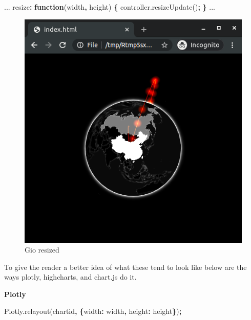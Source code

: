\documentclass[
]{krantz}
\makeatletter
\newenvironment{Shaded}{\begin{snugshade}}{\end{snugshade}}
\newcommand{\AttributeTok}[1]{\textcolor[rgb]{0.61,0.61,0.61}{#1}}
\newcommand{\DataTypeTok}[1]{\textcolor[rgb]{0.27,0.27,0.27}{#1}}
\newcommand{\KeywordTok}[1]{\textcolor[rgb]{0.27,0.27,0.27}{\textbf{#1}}}
\newcommand{\NormalTok}[1]{#1}
\newcommand{\OperatorTok}[1]{\textcolor[rgb]{0.43,0.43,0.43}{\textbf{#1}}}
\newcommand{\StringTok}[1]{\textcolor[rgb]{0.5,0.5,0.5}{#1}}
\newcommand{\VariableTok}[1]{\textcolor[rgb]{0,0,0}{#1}}
\newenvironment{kframe}{%
\medskip{}
\setlength{\fboxsep}{.8em}
 \def\at@end@of@kframe{}%
 \ifinner\ifhmode%
  \def\at@end@of@kframe{\end{minipage}}%
  \begin{minipage}{\columnwidth}%
 \fi\fi%
 \def\FrameCommand##1{\hskip\@totalleftmargin \hskip-\fboxsep
 \colorbox{shadecolor}{##1}\hskip-\fboxsep
     \hskip-\linewidth \hskip-\@totalleftmargin \hskip\columnwidth}%
 \MakeFramed {\advance\hsize-\width
   \@totalleftmargin\z@ \linewidth\hsize
   \@setminipage}}%
 {\par\unskip\endMakeFramed%
 \at@end@of@kframe}
\renewenvironment{Shaded}{\begin{kframe}}{\end{kframe}}
\makeatother
\begin{document}
\begin{Shaded}
\begin{Highlighting}[]
\NormalTok{...}
\NormalTok{resize}\OperatorTok{:} \KeywordTok{function}\NormalTok{(width}\OperatorTok{,}\NormalTok{ height) }\OperatorTok{\{}
  \VariableTok{controller}\NormalTok{.}\AttributeTok{resizeUpdate}\NormalTok{()}\OperatorTok{;}
\OperatorTok{\}}
\NormalTok{...}
\end{Highlighting}
\end{Shaded}

\begin{figure}
\centering
\includegraphics{images/gio-small.png}
\caption{Gio resized}
\end{figure}

To give the reader a better idea of what these tend to look like below are the ways plotly, highcharts, and chart.js do it.

\textbf{Plotly}

\begin{Shaded}
\begin{Highlighting}[]
\VariableTok{Plotly}\NormalTok{.}\AttributeTok{relayout}\NormalTok{(}\StringTok{\textquotesingle{}chartid\textquotesingle{}}\OperatorTok{,} \OperatorTok{\{}\DataTypeTok{width}\OperatorTok{:}\NormalTok{ width}\OperatorTok{,} \DataTypeTok{height}\OperatorTok{:}\NormalTok{ height}\OperatorTok{\}}\NormalTok{)}\OperatorTok{;}
\end{Highlighting}
\end{Shaded}
\end{document}
